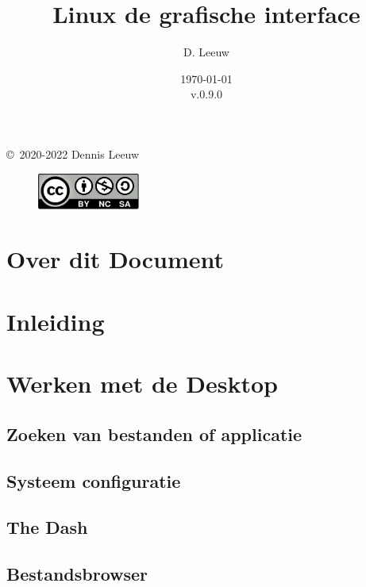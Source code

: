 \documentclass[a4paper,12pt,twoside,openright,titlepage]{book}
\author{D. Leeuw}
\title{Linux de grafische interface}
\date{\today\\v.0.9.0}
\begin{document}

\maketitle

\copyright\ 2020-2022 Dennis Leeuw\\

\begin{figure}
\includegraphics[width=0.3\textwidth]{linuxreader-img001.png}
\end{figure}

\bigskip




\frontmatter
\chapter{Over dit Document}



\tableofcontents

\mainmatter
\chapter{Inleiding}


\chapter{Werken met de Desktop}

\section{Zoeken van bestanden of applicatie}

\section{Systeem configuratie}

\section{The Dash}

\section{Bestandsbrowser}

\end{document}
